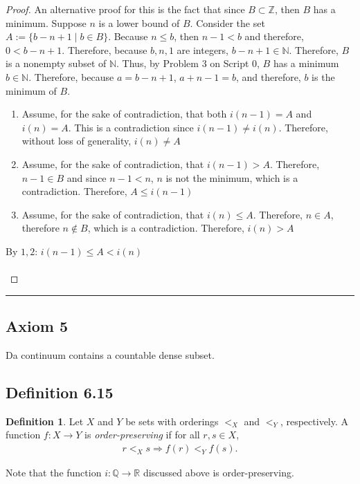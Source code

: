 \documentclass[openany, amssymb, psamsfonts]{amsart}
\newcommand{\bbN}{\mathbb{N}}
\newcommand{\bbQ}{\mathbb{Q}}
\newcommand{\bbR}{\mathbb{R}}
\newcommand{\bbZ}{\mathbb{Z}}
\newcommand{\arr}{\longrightarrow}
\theoremstyle{definition}
\newtheorem{defn}{Definition}[section]
\numberwithin{equation}{section}
\begin{document}
\begin{proof}
An alternative proof for this is the fact that since $B\subset \bbZ$, then $B$  has a minimum. Suppose $n$ is a lower bound of $B$. Consider the set $A:=\{b-n+1\mid b\in B\}$. Because $n\leq b$, then $n-1<b$ and therefore, $0<b-n+1$. Therefore, because $b,n,1$ are integers, $b-n+1 \in \bbN$. Therefore, $B$ is a nonempty subset of $\mathbb{N}$. Thus, by Problem 3 on Script 0, $B$ has a minimum $b\in\mathbb{N}$. Therefore, because $a = b-n+1$, $a+n-1 =b$, and therefore, $b$ is the minimum of $B$. 
\begin{enumerate}
\item Assume, for the sake of contradiction, that both $i(n-1) = A$ and $i(n) = A$. This is a contradiction since $i(n-1) \neq i(n)$. Therefore, without loss of generality, $i(n) \neq A$
\item Assume, for the sake of contradiction, that $i(n-1) > A$. Therefore, $n-1\in B$ and since $n-1<n$, $n$ is not the minimum, which is a contradiction. Therefore, $A\leq i(n-1)$
\item Assume, for the sake of contradiction, that $i(n) \leq A$. Therefore, $n\in A$, therefore $n \notin B$, which is a contradiction. Therefore, $i(n) > A$
\end{enumerate}
By $1,2$: $i(n-1) \leq A < i(n)$\\\\
\end{proof}\vspace{4pt}     \hrule   \vspace{4pt}

\subsection*{Axiom 5}
\label{Axiom 5}
Da continuum contains a countable dense subset.

\subsection*{Definition 6.15}
\begin{defn}
Let $X$ and $Y$ be sets with orderings $<_X$ and $<_Y$, respectively. A function $f\colon X \arr Y$ is \emph{order-preserving} if for all $r, s \in X$,
	\begin{align*}
		r <_X s \Longrightarrow f(r) <_Y f(s).
	\end{align*}
\end{defn}
Note that the function $i\colon \bbQ \arr \bbR$ discussed above is order-preserving.
\end{document}

